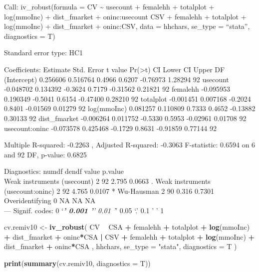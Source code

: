 \documentclass[
]{article}
\newenvironment{Shaded}{\begin{snugshade}}{\end{snugshade}}
\newcommand{\DataTypeTok}[1]{\textcolor[rgb]{0.13,0.29,0.53}{#1}}
\newcommand{\KeywordTok}[1]{\textcolor[rgb]{0.13,0.29,0.53}{\textbf{#1}}}
\newcommand{\NormalTok}[1]{#1}
\newcommand{\OperatorTok}[1]{\textcolor[rgb]{0.81,0.36,0.00}{\textbf{#1}}}
\newcommand{\StringTok}[1]{\textcolor[rgb]{0.31,0.60,0.02}{#1}}
\begin{document}
Call: iv\_robust(formula = CV \textasciitilde{} usecount + femalehh +
totalplot + log(mmoInc) + dist\_fmarket + oninc:usecount \textbar{} CSV
+ femalehh + totalplot + log(mmoInc) + dist\_fmarket + oninc:CSV, data =
hhchars, se\_type = ``stata'', diagnostics = T)

Standard error type: HC1

Coefficients: Estimate Std. Error t value
Pr(\textgreater\textbar t\textbar) CI Lower CI Upper DF (Intercept)
0.256606 0.516764 0.4966 0.6207 -0.76973 1.28294 92 usecount -0.048702
0.134392 -0.3624 0.7179 -0.31562 0.21821 92 femalehh -0.095953 0.190349
-0.5041 0.6154 -0.47400 0.28210 92 totalplot -0.001451 0.007168 -0.2024
0.8401 -0.01569 0.01279 92 log(mmoInc) 0.081257 0.110809 0.7333 0.4652
-0.13882 0.30133 92 dist\_fmarket -0.006264 0.011752 -0.5330 0.5953
-0.02961 0.01708 92 usecount:oninc -0.073578 0.425468 -0.1729 0.8631
-0.91859 0.77144 92

Multiple R-squared: -0.2263 , Adjusted R-squared: -0.3063 F-statistic:
0.6594 on 6 and 92 DF, p-value: 0.6825

Diagnostics: numdf dendf value p.value\\
Weak instruments (usecount) 2 92 2.795 0.0663 . Weak instruments
(usecount:oninc) 2 92 4.765 0.0107 * Wu-Hausman 2 90 0.316 0.7301\\
Overidentifying 0 NA NA NA\\
--- Signif. codes: 0 `\emph{\textbf{' 0.001 '}' 0.01 '}' 0.05 `.' 0.1 '
' 1

\begin{Shaded}
\begin{Highlighting}[]
\NormalTok{cv.remiv10 <-}
\StringTok{  }\KeywordTok{iv_robust}\NormalTok{(}
\NormalTok{    CV }\OperatorTok{~}\StringTok{ }\NormalTok{CSA }\OperatorTok{+}\StringTok{ }\NormalTok{femalehh }\OperatorTok{+}\StringTok{ }\NormalTok{totalplot }\OperatorTok{+}\StringTok{ }\KeywordTok{log}\NormalTok{(mmoInc) }\OperatorTok{+}\StringTok{ }\NormalTok{dist_fmarket }\OperatorTok{+}\StringTok{ }\NormalTok{oninc}\OperatorTok{*}\NormalTok{CSA }\OperatorTok{|}
\StringTok{      }\NormalTok{CSV }\OperatorTok{+}\StringTok{ }\NormalTok{femalehh }\OperatorTok{+}\StringTok{ }\NormalTok{totalplot }\OperatorTok{+}\StringTok{ }\KeywordTok{log}\NormalTok{(mmoInc) }\OperatorTok{+}\StringTok{ }\NormalTok{dist_fmarket }\OperatorTok{+}\StringTok{ }\NormalTok{oninc}\OperatorTok{*}\NormalTok{CSA ,}
\NormalTok{    hhchars,}
    \DataTypeTok{se_type =} \StringTok{"stata"}\NormalTok{,}
    \DataTypeTok{diagnostics =}\NormalTok{ T}
\NormalTok{  )}

\KeywordTok{print}\NormalTok{(}\KeywordTok{summary}\NormalTok{(cv.remiv10, }\DataTypeTok{diagnostics =}\NormalTok{ T))}
\end{Highlighting}
\end{Shaded}
\end{document}
